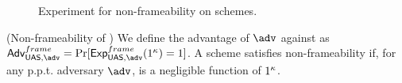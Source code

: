 \begin{figure}[htp!]
  \caption{Experiment for non-frameability on \UAS schemes.}
  \label{fig:exp-uas-frame}
\end{figure}

\begin{definition}{(Non-frameability of \UAS)}
  \label{def:frame-uas}
  We define the advantage \AdvNonframe of $\adv$ against \ExpNonframe as
  $\AdvNonframe=\Pr\lbrack\ExpNonframe(1^\secpar)=1\rbrack$.
  A \GSAC scheme satisfies non-frameability if, for any p.p.t. adversary $\adv$,
  \AdvNonframe is a negligible function of $1^\kappa$.
\end{definition}

